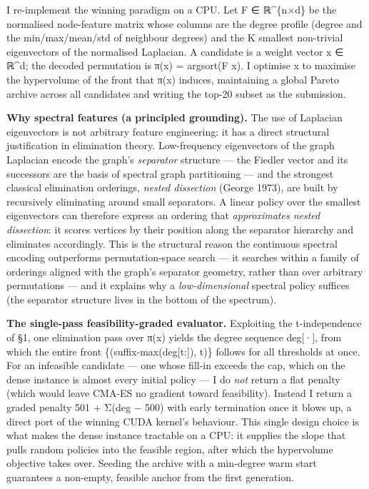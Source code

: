\documentclass[
  11pt,
]{article}
\begin{document}
I re-implement the winning paradigm on a CPU. Let F ∈ ℝ\^{}\{n×d\} be
the normalised node-feature matrix whose columns are the degree profile
(degree and the min/max/mean/std of neighbour degrees) and the K
smallest non-trivial eigenvectors of the normalised Laplacian. A
candidate is a weight vector x ∈ ℝ\^{}d; the decoded permutation is π(x)
= argsort(F x). I optimise x to maximise the hypervolume of the front
that π(x) induces, maintaining a global Pareto archive across all
candidates and writing the top-20 subset as the submission.

\textbf{Why spectral features (a principled grounding).} The use of
Laplacian eigenvectors is not arbitrary feature engineering: it has a
direct structural justification in elimination theory. Low-frequency
eigenvectors of the graph Laplacian encode the graph's \emph{separator}
structure --- the Fiedler vector and its successors are the basis of
spectral graph partitioning --- and the strongest classical elimination
orderings, \emph{nested dissection} (George 1973), are built by
recursively eliminating around small separators. A linear policy over
the smallest eigenvectors can therefore express an ordering that
\emph{approximates nested dissection}: it scores vertices by their
position along the separator hierarchy and eliminates accordingly. This
is the structural reason the continuous spectral encoding outperforms
permutation-space search --- it searches within a family of orderings
aligned with the graph's separator geometry, rather than over arbitrary
permutations --- and it explains why a \emph{low-dimensional} spectral
policy suffices (the separator structure lives in the bottom of the
spectrum).

\textbf{The single-pass feasibility-graded evaluator.} Exploiting the
t-independence of §1, one elimination pass over π(x) yields the degree
sequence deg{[}·{]}, from which the entire front
\{(suffix-max(deg{[}t:{]}), t)\} follows for all thresholds at once. For
an infeasible candidate --- one whose fill-in exceeds the cap, which on
the dense instance is almost every initial policy --- I do \emph{not}
return a flat penalty (which would leave CMA-ES no gradient toward
feasibility). Instead I return a graded penalty 501 + Σ(deg − 500) with
early termination once it blows up, a direct port of the winning CUDA
kernel's behaviour. This single design choice is what makes the dense
instance tractable on a CPU: it supplies the slope that pulls random
policies into the feasible region, after which the hypervolume objective
takes over. Seeding the archive with a min-degree warm start guarantees
a non-empty, feasible anchor from the first generation.
\end{document}
